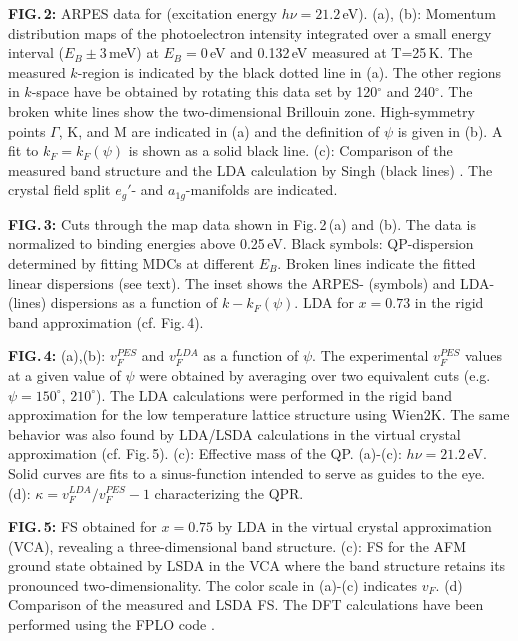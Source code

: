 \documentclass[preprint,showpacs,preprintnumbers,amsmath,amssymb,twoside,aps]{revtex4}
\begin{document}
{\bf FIG.\,2:} ARPES data for \NCO\/ (excitation energy $h \nu=21.2$\,eV). (a), (b): Momentum distribution maps of the photoelectron intensity
integrated over a small energy interval ($E_B\pm 3$\,meV) at $E_B=0$\,eV and 0.132\,eV measured at T=25\,K. The measured $k$-region is indicated by
the black dotted line in (a). The other regions in $k$-space have be obtained by rotating this data set by 120$^{\circ}$ and 240$^{\circ}$. The
broken white lines show the two-dimensional Brillouin zone. High-symmetry points $\Gamma$, K, and M are indicated in (a) and the definition of $\psi$
is given in (b). A fit to $k_F=k_F(\psi)$ is shown as a solid black line.  (c): Comparison of the measured band structure and the LDA calculation by
Singh (black lines) \cite{SinghPRB00}. The crystal field split $e_g'$- and $a_{1g}$-manifolds are indicated.\label{fig:2}


%
{\bf FIG.\,3:} Cuts through the map data shown in Fig.\,2\,(a) and (b). The data is normalized to binding energies above 0.25\,eV. Black symbols:
QP-dispersion determined by fitting MDCs at different $E_B$. Broken lines indicate the fitted linear dispersions (see text).  The inset shows the
ARPES- (symbols) and LDA- (lines) dispersions as a function of $k-k_F(\psi)$. LDA for $x=0.73$ in the rigid band approximation (cf. Fig.\,4).
\label{fig:3}

{\bf FIG.\,4:} (a),(b): $v_F^{PES}$ and $v_F^{LDA}$ as a function of $\psi$. The experimental $v_F^{PES}$ values at a given value of $\psi$ were
obtained by averaging over two equivalent cuts (e.g. $\psi=150^{\circ}$, $210^{\circ}$).  The LDA calculations were performed in the rigid band
approximation for the low temperature lattice structure using Wien2K. The same behavior was also found by LDA/LSDA calculations in the virtual
crystal approximation (cf. Fig.\,5). (c): Effective mass of the QP. (a)-(c): $h \nu=21.2$\,eV. Solid curves are fits to a sinus-function intended to
serve as guides to the eye. (d): $\kappa=v_F^{LDA}/v_F^{PES}-1$ characterizing the QPR. \label{fig:4}

{\bf FIG.\,5:} FS obtained for $x=0.75$ by LDA in the virtual crystal approximation (VCA), revealing a three-dimensional band structure. (c): FS for
the AFM ground state obtained by LSDA in the VCA where the band structure retains its pronounced two-dimensionality. The color scale in (a)-(c)
indicates $v_F$. (d) Comparison of the measured and LSDA FS. The DFT calculations have been performed using the FPLO code
\cite{EschrigPRB99}.\label{fig:5}
%
\end{document}
